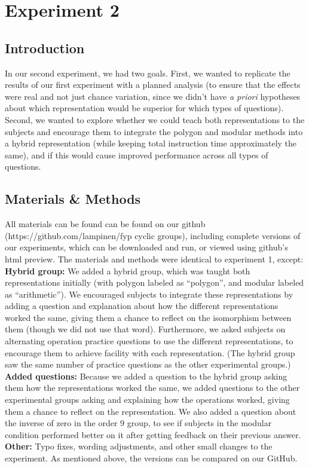 \documentclass[11pt]{article}
\begin{document}
\section{Experiment 2}
\subsection{Introduction}
In our second experiment, we had two goals. First, we wanted to replicate the results of our first experiment with a planned analysis (to ensure that the effects were real and not just chance variation, since we didn't have \textit{a priori} hypotheses about which representation would be superior for which types of questions). Second, we wanted to explore whether we could teach both representations to the subjects and encourage them to integrate the polygon and modular methods into a hybrid representation (while keeping total instruction time approximately the same), and if this would cause improved performance across all types of questions. 
\subsection{Materials \& Methods} 
All materials can be found can be found on our github (https://github.com/lampinen/fyp cyclic groups), including complete versions of our experiments, which can be downloaded and run, or viewed using github's html preview. The materials and methods were identical to experiment 1, except:\\[11pt]
\textbf{Hybrid group:} We added a hybrid group, which was taught both representations initially (with polygon labeled as ``polygon'', and modular labeled as ``arithmetic''). We encouraged subjects to integrate these representations by adding a question and explanation about how the different representations worked the same, giving them a chance to reflect on the isomorphism between them (though we did not use that word). Furthermore, we asked subjects on alternating operation practice questions to use the different representations, to encourage them to achieve facility with each representation. (The hybrid group saw the same number of practice questions as the other experimental groups.)\\[11pt]
\textbf{Added questions:} Because we added a question to the hybrid group asking them how the representations worked the same, we added questions to the other experimental groups asking and explaining how the operations worked, giving them a chance to reflect on the representation. We also added a question about the inverse of zero in the order 9 group, to see if subjects in the modular condition performed better on it after getting feedback on their previous answer. \\[11pt]
\textbf{Other:} Typo fixes, wording adjustments, and other small changes to the experiment. As mentioned above, the versions can be compared on our GitHub.
\end{document}
